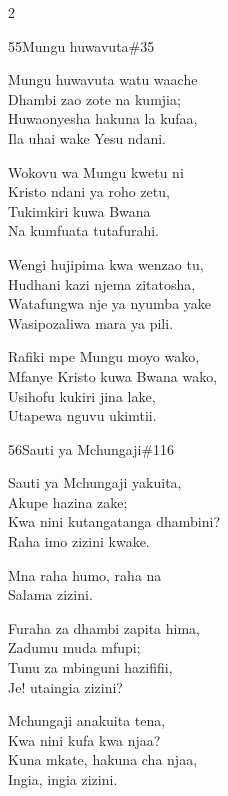 \documentclass{article}
\begin{document}
\begin{multicols}{2}
\begin{hymn}{55}{Mungu huwavuta}{\#35}
\begin{stanza}
Mungu huwavuta watu waache\\
Dhambi zao zote na kumjia;\\
Huwaonyesha hakuna la kufaa,\\
Ila uhai wake Yesu ndani.
\end{stanza}
\begin{chorus}
Wokovu wa Mungu kwetu ni\\
Kristo ndani ya roho zetu,\\
Tukimkiri kuwa Bwana\\
Na kumfuata tutafurahi.
\end{chorus}
\begin{stanza}
Wengi hujipima kwa wenzao tu,\\
Hudhani kazi njema zitatosha,\\
Watafungwa nje ya nyumba yake\\
Wasipozaliwa mara ya pili.
\end{stanza}
\begin{stanza}
Rafiki mpe Mungu moyo wako,\\
Mfanye Kristo kuwa Bwana wako,\\
Usihofu kukiri jina lake,\\
Utapewa nguvu ukimtii.
\end{stanza}
\end{hymn}

\begin{hymn}{56}{Sauti ya Mchungaji}{\#116}
\begin{stanza}
Sauti ya Mchungaji yakuita,\\
Akupe hazina zake;\\
Kwa nini kutangatanga dhambini?\\
Raha imo zizini kwake.
\end{stanza}
\begin{chorus}
Mna raha humo, raha na\\
Salama zizini.
\end{chorus}
\begin{stanza}
Furaha za dhambi zapita hima,\\
Zadumu muda mfupi;\\
Tunu za mbinguni hazififii,\\
Je! utaingia zizini?
\end{stanza}
\begin{stanza}
Mchungaji anakuita tena,\\
Kwa nini kufa kwa njaa?\\
Kuna mkate, hakuna cha njaa,\\
Ingia, ingia zizini.
\end{stanza}
\end{hymn}


\end{multicols}
\end{document}
